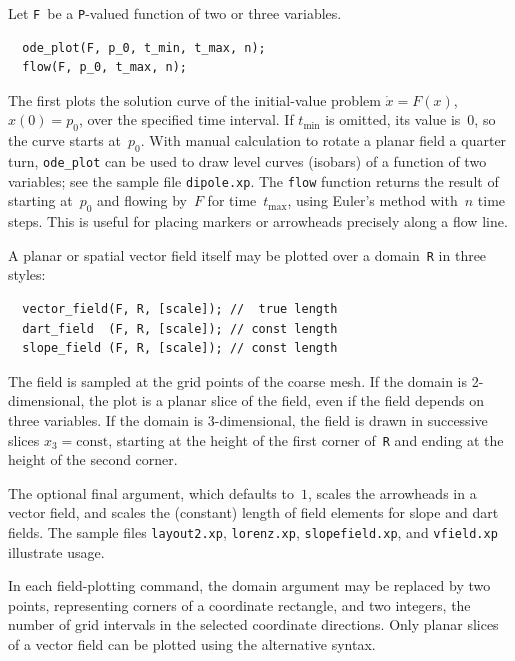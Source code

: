 \documentclass[12pt,letterpaper]{book}
\newcommand{\code}[1]{\texttt{#1}}
\newcommand{\filename}[1]{\texttt{#1}}
\newcommand{\teximath}[1]{$#1$}
\newcommand{\findex}[1]{\ignorespaces}
\begin{document}
Let \code{F}~be a \code{P}-valued function of two or three variables.
\findex{ode\_plot}
\findex{flow}
\begin{verbatim}
  ode_plot(F, p_0, t_min, t_max, n); 
  flow(F, p_0, t_max, n);
\end{verbatim}
The first plots the solution curve of the initial-value problem
\teximath{\dot{x}=F(x)}, \teximath{x(0)=p_0}, over the specified time
interval.  If \teximath{t_\mathrm{min}} is omitted, its value is~0, so
the curve starts at~\teximath{p_0}. With manual calculation to rotate
a planar field a quarter turn, \code{ode\_plot} can be used to draw
level curves (isobars) of a function of two variables; see the sample
file \filename{dipole.xp}.  The \code{flow} function returns the
result of starting at~\teximath{p_0} and flowing by~\teximath{F} for
time~\teximath{t_\mathrm{max}}, using Euler's method with~\teximath{n}
time steps.  This is useful for placing markers or arrowheads precisely
along a flow line.

A planar or spatial vector field itself may be plotted over a
domain~\code{R} in three styles:
\findex{vector\_field}
\findex{dart\_field}
\findex{slope\_field}
\begin{verbatim}
  vector_field(F, R, [scale]); //  true length
  dart_field  (F, R, [scale]); // const length
  slope_field (F, R, [scale]); // const length
\end{verbatim}
The field is sampled at the grid points of the coarse mesh. If the
domain is 2-dimensional, the plot is a planar slice of the field, even
if the field depends on three variables. If the domain is
3-dimensional, the field is drawn in successive slices
\teximath{x_3=\mathrm{const}}, starting at the height of the first
corner of~\code{R} and ending at the height of the second corner.

The optional final argument, which defaults to~\teximath{1}, scales the
arrowheads in a vector field, and scales the (constant) length of
field elements for slope and dart fields. The sample files
\filename{layout2.xp}, \filename{lorenz.xp}, \filename{slopefield.xp},
and \filename{vfield.xp} illustrate usage.

In each field-plotting command, the domain argument may be replaced by
two points, representing corners of a coordinate rectangle, and two
integers, the number of grid intervals in the selected coordinate
directions. Only planar slices of a vector field can be plotted using
the alternative syntax.
\end{document}
